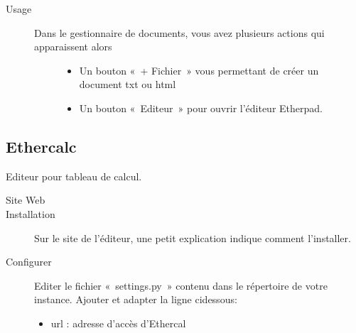 \documentclass[a4paper,10pt,oneside,french]{sphinxmanual}
\begin{document}
\begin{sphinxVerbatim}[commandchars=\\\{\}]
     
\end{sphinxVerbatim}
\begin{description}
\item[{Usage}] \leavevmode\begin{description}
\item[{Dans le gestionnaire de documents, vous avez plusieurs actions qui apparaissent alors}] \leavevmode\begin{itemize}
\item {} 
Un bouton « + Fichier » vous permettant de créer un document txt ou html

\item {} 
Un bouton « Editeur » pour ouvrir l’éditeur Etherpad.

\end{itemize}

\end{description}

\end{description}

\noindent{}


\subsection{Ethercalc}
\label{\detokenize{documents/editor:ethercalc}}
Editeur pour tableau de calcul.
\begin{description}
\item[{Site Web}] \leavevmode
{}

\item[{Installation}] \leavevmode
Sur le site de l’éditeur, une petit explication indique comment l’installer.

\item[{Configurer}] \leavevmode
Editer le fichier « settings.py » contenu dans le répertoire de votre instance.
Ajouter et adapter la ligne ci\sphinxhyphen{}dessous:
\begin{itemize}
\item {} 
url : adresse d’accès d’Ethercal

\end{itemize}

\end{description}
\end{document}
